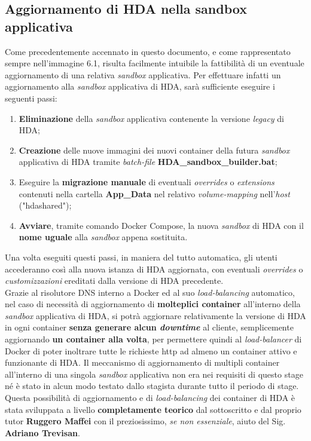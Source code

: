 \subsection{Aggiornamento di HDA nella sandbox applicativa}
Come precedentemente accennato in questo documento, e come rappresentato sempre nell'immagine 6.1, risulta facilmente intuibile la fattibilità di un eventuale aggiornamento di una relativa \textit{sandbox} applicativa. Per effettuare infatti un aggiornamento alla \textit{sandbox} applicativa di HDA, sarà sufficiente eseguire i seguenti passi:
\begin{enumerate}
	\item \textbf{Eliminazione} della \textit{sandbox} applicativa contenente la versione \textit{legacy} di HDA;
	\item \textbf{Creazione} delle nuove immagini dei nuovi container della futura \textit{sandbox} applicativa di HDA tramite \textit{batch-file} \textbf{HDA\_sandbox\_builder.bat};
	\item Eseguire la \textbf{migrazione manuale} di eventuali \textit{overrides} o \textit{extensions} contenuti nella cartella \textbf{App\_Data} nel relativo \textit{volume-mapping} nell'\textit{host} ("hdashared");
	\item \textbf{Avviare}, tramite comando Docker Compose, la nuova \textit{sandbox} di HDA con il \textbf{nome uguale} alla \textit{sandbox} appena sostituita.
\end{enumerate}

Una volta eseguiti questi passi, in maniera del tutto automatica, gli utenti accederanno così alla nuova istanza di HDA aggiornata, con eventuali \textit{overrides} o \textit{customizzazioni} ereditati dalla versione di HDA precedente.\\

Grazie al risolutore DNS interno a Docker ed al suo \textit{load-balancing} automatico, nel caso di necessità di aggiornamento di \textbf{molteplici container} all'interno della \textit{sandbox} applicativa di HDA, si potrà aggiornare relativamente la versione di HDA in ogni container \textbf{senza generare alcun \textit{downtime}} al cliente, semplicemente aggiornando \textbf{un container alla volta}, per permettere quindi al \textit{load-balancer} di Docker di poter inoltrare tutte le richieste http ad almeno un container attivo e funzionante di HDA. Il meccanismo di aggiornamento di multipli container all'interno di una singola \textit{sandbox} applicativa non era nei requisiti di questo stage né è stato in alcun modo testato dallo stagista durante tutto il periodo di stage. Questa possibilità di aggiornamento e di \textit{load-balancing} dei container di HDA è stata sviluppata a livello \textbf{completamente teorico} dal sottoscritto e dal proprio tutor \textbf{Ruggero Maffei} con il preziosissimo, \textit{se non essenziale}, aiuto del Sig. \textbf{Adriano Trevisan}.

